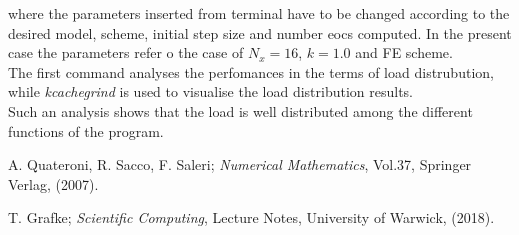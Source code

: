 \documentclass[11pt]{article}
\theoremstyle{theorem}
\theoremstyle{definition}
\begin{document}
where the parameters inserted from terminal have to be changed according to the desired model, scheme, initial step size and number eocs computed. In the present case the parameters refer o the case of $N_x=16$, $k=1.0$ and FE scheme.\\
The first command analyses the perfomances in the terms of load distrubution, while \emph{kcachegrind} is used to visualise the load distribution results.\\

Such an analysis shows that the load is well distributed among the different functions of the program.\\



\cleardoublepage
\begin{thebibliography}{99}

 A. Quateroni, R. Sacco, F. Saleri;
\emph{Numerical Mathematics}, Vol.37, Springer Verlag, (2007).

 T. Grafke;
\emph{Scientific Computing}, Lecture Notes, University of Warwick, (2018).







\printindex
\end{thebibliography}
\end{document}
